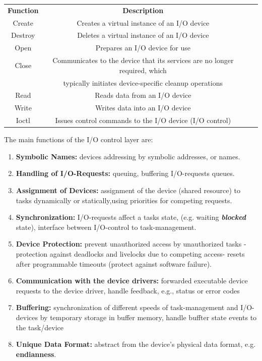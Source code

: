 \begin{table}[h!]
\setlength{\tabcolsep}{10pt} %
\renewcommand{\arraystretch}{1.5} %
\centering
 \begin{tabular}{|c|c|c|c|} \hline
 \textbf{Function} & \textbf{Description} \\ [0.1ex] 
Create & Creates a virtual instance of an I/O device \\ \hline 
Destroy & Deletes a virtual instance of an I/O device \\ \hline 
Open & Prepares an I/O device for use \\ \hline 
Close & Communicates to the device that its services are no longer required, which \\ & typically initiates  device-specific cleanup operations \\ \hline 
Read & Reads data from an I/O device \\ \hline 
Write & Writes data into an I/O device \\ \hline 
Ioctl & Issues control commands to the I/O device (I/O control) \\ \hline 
 \end{tabular}
\end{table}

The main functions of the I/O control layer are:

\begin{enumerate}
\item  \textbf{Symbolic Names: }devices addressing by symbolic addresses, or names.
\item  \textbf{Handling of I/O-Requests: }queuing, buffering I/O-requests  queues.
\os{\newpage}
\item  \textbf{Assignment of Devices: }assignment of the device (shared resource) to tasks dynamically or 	statically,using priorities for competing requests. 
\item  \textbf{Synchronization: }I/O-requests affect a tasks state, (e.g. waiting  \textbf{\textit{blocked}} state), interface between I/O-control to task-management.
\item  \textbf{Device Protection: } prevent unauthorized access by unauthorized tasks - protection against deadlocks and livelocks due to competing access- resets after programmable timeouts (protect against software failure).
\item  \textbf{Communication with the device drivers: }forwarded executable device requests to the device driver, handle feedback, e.g., status or error codes 
\item  \textbf{Buffering: }synchronization of different speeds of task-management and I/O-devices by temporary storage in buffer memory, handle buffter state events to the task/device
\item  \textbf{Unique Data Format: }abstract from the device's physical data format, e.g. \textbf{endianness}.
\end{enumerate}

